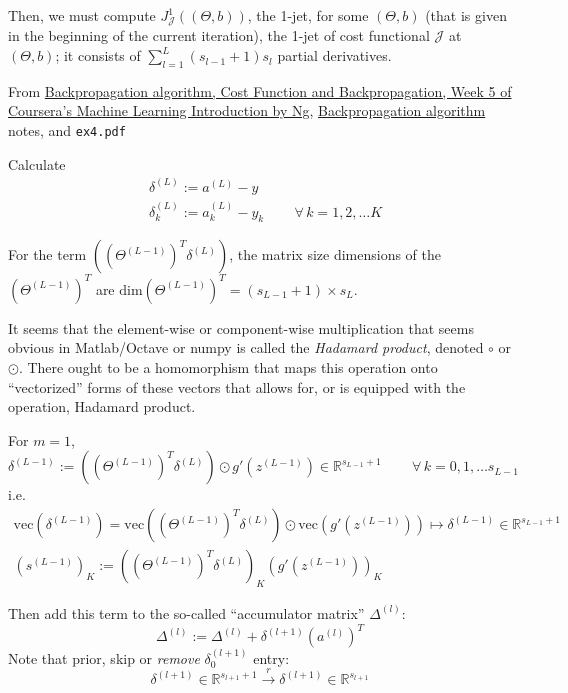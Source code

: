 \documentclass[10pt]{amsart}
\begin{document}
\begin{multicols*}{2}
Then, we must compute $J^1_{\mathcal{J}}( (\Theta,b))$, the 1-jet, for some $(\Theta,b)$ (that is given in the beginning of the current iteration), the 1-jet of cost functional $\mathcal{J}$ at $(\Theta,b)$; it consists of $\sum_{l=1}^L (s_{l-1} + 1)s_l$ partial derivatives.  




From \href{https://www.coursera.org/learn/machine-learning/lecture/1z9WW/backpropagation-algorithm}{Backpropagation algorithm, Cost Function and Backpropagation, Week 5 of Coursera's Machine Learning Introduction by Ng}, \href{https://www.coursera.org/learn/machine-learning/supplement/pjdBA/backpropagation-algorithm}{Backpropagation algorithm} notes, and \verb|ex4.pdf|

Calculate
\begin{equation}
\begin{aligned}
  & \delta^{(L)} := a^{(L)} - y \\ 
  & \delta^{(L)}_k := a_k^{(L)} - y_k \qquad \, \forall \, k = 1,2, \dots K
  \end{aligned}
\end{equation}

For the term $((\Theta^{(L-1)})^T \delta^{(L)} )$, the matrix size dimensions of the $(\Theta^{(L-1)})^T$ are $\text{dim}( \Theta^{(L-1)} )^T = (s_{L-1}  + 1) \times s_L$.

It seems that the element-wise or component-wise multiplication that seems obvious in Matlab/Octave or numpy is called the \emph{Hadamard product}, denoted $\circ$ or $\odot$.  There ought to be a homomorphism that maps this operation onto ``vectorized'' forms of these vectors that allows for, or is equipped with the operation, Hadamard product.

For $m=1$,
\[
\delta^{(L-1)} := \left( ( \Theta^{(L-1)})^T \delta^{(L)} \right) \odot g'(z^{(L-1)}) \in \mathbb{R}^{s_{L-1} + 1} \qquad \, \forall \, k = 0 , 1, \dots s_{L-1}
\]
i.e.
\[
\begin{gathered}
  \text{vec}(\delta^{(L-1)} ) = \text{vec} ((\Theta^{(L-1)})^T \delta^{(L)} ) \odot \text{vec}( g'(z^{(L-1)}) ) \mapsto \delta^{(L-1)} \in \mathbb{R}^{s_{L-1} + 1} \\ 
 (s^{(L-1)} )_K := ((\Theta^{(L-1)})^T \delta^{(L)} )_K (g'(z^{(L-1)} ) )_K
\end{gathered}
\]

Then add this term to the so-called ``accumulator matrix'' $\Delta^{(l)}$:
\[
\Delta^{(l)} := \Delta^{(l)} + \delta^{(l+1)} (a^{(l)})^T
\]
Note that prior, skip or \emph{remove} $\delta_0^{(l+1)}$ entry:
\[
\delta^{(l+1)} \in \mathbb{R}^{ s_{l+1} + 1} \xrightarrow{ r} \delta^{(l+1)} \in \mathbb{R}^{s_{l+1} }
\]


\end{multicols*}
\end{document}
